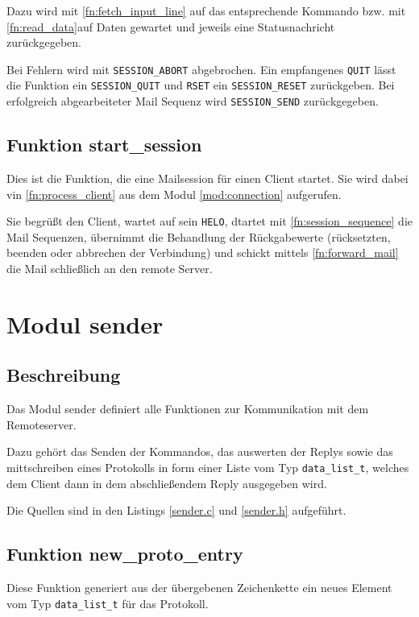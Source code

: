 \documentclass[pdftex,final,a4paper,10pt,notitlepage,halfparskip]{scrreprt}
\begin{document}
Dazu wird mit \ref{fn:fetch_input_line} auf das entsprechende Kommando bzw. mit \ref{fn:read_data}auf Daten gewartet und jeweils eine Statusnachricht zurückgegeben.

Bei Fehlern wird mit \texttt{SESSION\_ABORT} abgebrochen. Ein empfangenes \texttt{QUIT} lässt die Funktion ein \texttt{SESSION\_QUIT} und \texttt{RSET} ein \texttt{SESSION\_RESET} zurückgeben. Bei erfolgreich abgearbeiteter Mail Sequenz wird \texttt{SESSION\_SEND} zurückgegeben.

\subsection{Funktion start\_session}\label{fn:start_session}
Dies ist die Funktion, die eine Mailsession für einen Client startet. Sie wird dabei vin \ref{fn:process_client} aus dem Modul \ref{mod:connection} aufgerufen.

Sie begrüßt den Client, wartet auf sein \texttt{HELO}, dtartet mit \ref{fn:session_sequence} die Mail Sequenzen, übernimmt die Behandlung der Rückgabewerte (rücksetzten, beenden oder abbrechen der Verbindung) und schickt mittels \ref{fn:forward_mail} die Mail schließlich an den remote Server.



\section{Modul sender}\label{mod:sender}
\subsection{Beschreibung}
Das Modul sender definiert alle Funktionen zur Kommunikation mit dem Remoteserver.

Dazu gehört das Senden der Kommandos, das auswerten der Replys sowie das mittschreiben eines Protokolls in form einer Liste vom Typ \texttt{data\_list\_t}, welches dem Client dann in dem abschließendem Reply ausgegeben wird.

Die Quellen sind in den Listings \ref{sender.c} und \ref{sender.h} aufgeführt.

\subsection{Funktion new\_proto\_entry}\label{fn:new_proto_entry}
Diese Funktion generiert aus der übergebenen Zeichenkette ein neues Element vom Typ \texttt{data\_list\_t} für das Protokoll.
\end{document}
